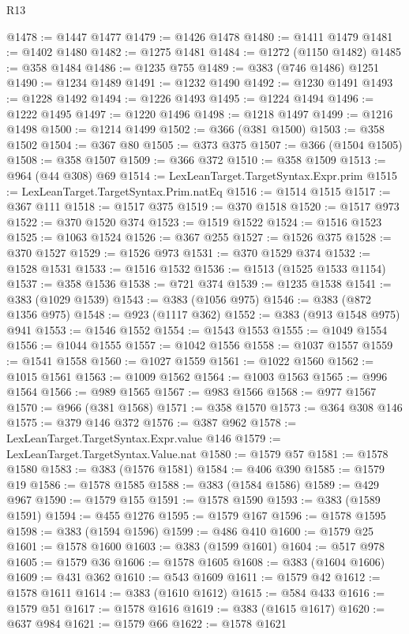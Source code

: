 \begin{lexlean}{R13}
\begin{coremodule}
{{{{{{{{{{{{{{{{{{{{{{{{{{{{{{{{{{{{{{{{{{{{{{{{{{{{{{@1478 := @1447 @1477
@1479 := @1426 @1478
@1480 := @1411 @1479
@1481 := @1402 @1480
@1482 := @1275 @1481
@1484 := @1272 (@1150 @1482)
@1485 := @358 @1484
@1486 := @1235 @755
@1489 := @383 (@746 @1486) @1251
@1490 := @1234 @1489
@1491 := @1232 @1490
@1492 := @1230 @1491
@1493 := @1228 @1492
@1494 := @1226 @1493
@1495 := @1224 @1494
@1496 := @1222 @1495
@1497 := @1220 @1496
@1498 := @1218 @1497
@1499 := @1216 @1498
@1500 := @1214 @1499
@1502 := @366 (@381 @1500)
@1503 := @358 @1502
@1504 := @367 @80
@1505 := @373 @375
@1507 := @366 (@1504 @1505)
@1508 := @358 @1507
@1509 := @366 @372
@1510 := @358 @1509
@1513 := @964 (@44 @308) @69
@1514 := LexLeanTarget.TargetSyntax.Expr.prim
@1515 := LexLeanTarget.TargetSyntax.Prim.natEq
@1516 := @1514 @1515
@1517 := @367 @111
@1518 := @1517 @375
@1519 := @370 @1518
@1520 := @1517 @973
@1522 := @370 @1520 @374
@1523 := @1519 @1522
@1524 := @1516 @1523
@1525 := @1063 @1524
@1526 := @367 @255
@1527 := @1526 @375
@1528 := @370 @1527
@1529 := @1526 @973
@1531 := @370 @1529 @374
@1532 := @1528 @1531
@1533 := @1516 @1532
@1536 := @1513 (@1525 @1533 @1154)
@1537 := @358 @1536
@1538 := @721 @374
@1539 := @1235 @1538
@1541 := @383 (@1029 @1539)
@1543 := @383 (@1056 @975)
@1546 := @383 (@872 @1356 @975)
@1548 := @923 (@1117 @362)
@1552 := @383 (@913 @1548 @975) @941
@1553 := @1546 @1552
@1554 := @1543 @1553
@1555 := @1049 @1554
@1556 := @1044 @1555
@1557 := @1042 @1556
@1558 := @1037 @1557
@1559 := @1541 @1558
@1560 := @1027 @1559
@1561 := @1022 @1560
@1562 := @1015 @1561
@1563 := @1009 @1562
@1564 := @1003 @1563
@1565 := @996 @1564
@1566 := @989 @1565
@1567 := @983 @1566
@1568 := @977 @1567
@1570 := @966 (@381 @1568)
@1571 := @358 @1570
@1573 := @364 @308 @146
@1575 := @379 @146 @372
@1576 := @387 @962
@1578 := LexLeanTarget.TargetSyntax.Expr.value @146
@1579 := LexLeanTarget.TargetSyntax.Value.nat
@1580 := @1579 @57
@1581 := @1578 @1580
@1583 := @383 (@1576 @1581)
@1584 := @406 @390
@1585 := @1579 @19
@1586 := @1578 @1585
@1588 := @383 (@1584 @1586)
@1589 := @429 @967
@1590 := @1579 @155
@1591 := @1578 @1590
@1593 := @383 (@1589 @1591)
@1594 := @455 @1276
@1595 := @1579 @167
@1596 := @1578 @1595
@1598 := @383 (@1594 @1596)
@1599 := @486 @410
@1600 := @1579 @25
@1601 := @1578 @1600
@1603 := @383 (@1599 @1601)
@1604 := @517 @978
@1605 := @1579 @36
@1606 := @1578 @1605
@1608 := @383 (@1604 @1606)
@1609 := @431 @362
@1610 := @543 @1609
@1611 := @1579 @42
@1612 := @1578 @1611
@1614 := @383 (@1610 @1612)
@1615 := @584 @433
@1616 := @1579 @51
@1617 := @1578 @1616
@1619 := @383 (@1615 @1617)
@1620 := @637 @984
@1621 := @1579 @66
@1622 := @1578 @1621
}}}}}}}}}}}}}}}}}}}}}}}}}}}}}}}}}}}}}}}}}}}}}}}}}}}}}}
\end{coremodule}
\end{lexlean}
